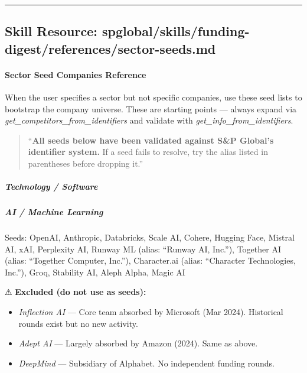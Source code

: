 \documentclass[11pt]{article}
\begin{document}
\vspace{0.8em}\hrule\vspace{0.8em}

\subsection{Skill Resource: spglobal/skills/funding-digest/references/sector-seeds.md}\label{file:spglobal-skills-funding-digest-references-sector-seeds.md}

\paragraph{Sector Seed Companies Reference}\mbox{}\par

When the user specifies a sector but not specific companies, use these seed lists to bootstrap the company universe. These are starting points — always expand via \emph{get\_\allowbreak{}competitors\_\allowbreak{}from\_\allowbreak{}identifiers} and validate with \emph{get\_\allowbreak{}info\_\allowbreak{}from\_\allowbreak{}identifiers}.


\begin{quote}
``\textbf{All seeds below have been validated against S\&P Global's identifier system.} If a seed fails to resolve, try the alias listed in parentheses before dropping it.''
\end{quote}

\subparagraph{Technology / Software}\mbox{}\par

\subparagraph{AI / Machine Learning}\mbox{}\par
Seeds: OpenAI, Anthropic, Databricks, Scale AI, Cohere, Hugging Face, Mistral AI, xAI, Perplexity AI, Runway ML (alias: ``Runway AI, Inc.''), Together AI (alias: ``Together Computer, Inc.''), Character.ai (alias: ``Character Technologies, Inc.''), Groq, Stability AI, Aleph Alpha, Magic AI


⚠ \textbf{Excluded (do not use as seeds):}

\begin{itemize}[leftmargin=*,itemsep=2pt,topsep=2pt]
\item {} \emph{Inflection AI} — Core team absorbed by Microsoft (Mar 2024). Historical rounds exist but no new activity.
\item {} \emph{Adept AI} — Largely absorbed by Amazon (2024). Same as above.
\item {} \emph{DeepMind} — Subsidiary of Alphabet. No independent funding rounds.
\end{itemize}
\end{document}
